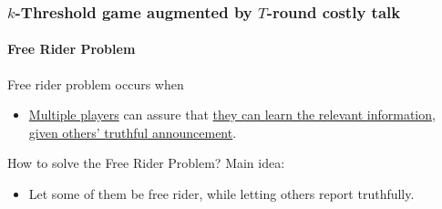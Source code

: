 \documentclass[8pt]{beamer}
\begin{document}
\begin{frame}
  \frametitle{$k$-Threshold game augmented by $T$-round costly talk}
  \framesubtitle{Free Rider Problem}

Free rider problem occurs when 
\begin{itemize}
\item \underline{Multiple players} can assure that \underline{they can learn the relevant information, given others' truthful announcement}. 
\end{itemize}

How to solve the Free Rider Problem? Main idea:

\begin{itemize}
\item Let some of them be free rider, while letting others report truthfully.
\end{itemize}


\end{frame}
\end{document}
